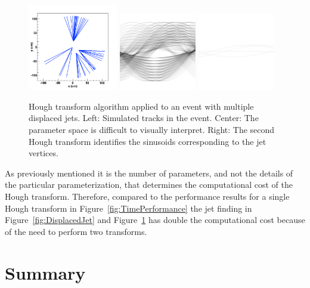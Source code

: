 \documentclass{JINST}
\begin{document}
\begin{figure}[!Hhtb]
\begin{center}
	\includegraphics[width=0.35\textwidth]{figs/jet2/tracks.pdf}
	\includegraphics[width=0.30\textwidth]{figs/jet2/accumulator.pdf}
	\includegraphics[width=0.30\textwidth]{figs/jet2/vertex.pdf}
	\caption{Hough transform algorithm applied to an event with multiple displaced jets. Left: Simulated
	tracks in the event. Center: The parameter space is difficult to visually interpret. Right: The
	second Hough transform identifies the sinusoids corresponding to the jet vertices.
	\label{fig:DisplacedJets}}
\end{center}
\end{figure}

As previously mentioned it is the number of parameters, and not the details of the particular parameterization, that determines the computational cost of the Hough transform.  Therefore, compared to the performance results for a single Hough transform in Figure~\ref{fig:TimePerformance} the jet finding in Figure~\ref{fig:DisplacedJet} and Figure~\ref{fig:DisplacedJets} has double the computational cost because of the need to perform two transforms.
%
\section{Summary}
%
\end{document}
